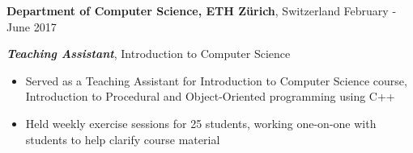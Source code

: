 
\vspace{5pt}

\textbf{Department of Computer Science, ETH Zürich}, Switzerland \hfill February - June 2017

\textbf{\textit{Teaching Assistant}}, Introduction to Computer Science

\begin{itemize}
    \item Served as a Teaching Assistant for Introduction to Computer Science course, Introduction to Procedural and Object-Oriented programming using C++
    \item Held weekly exercise sessions for 25 students, working one-on-one with students to help clarify course material
\end{itemize}

